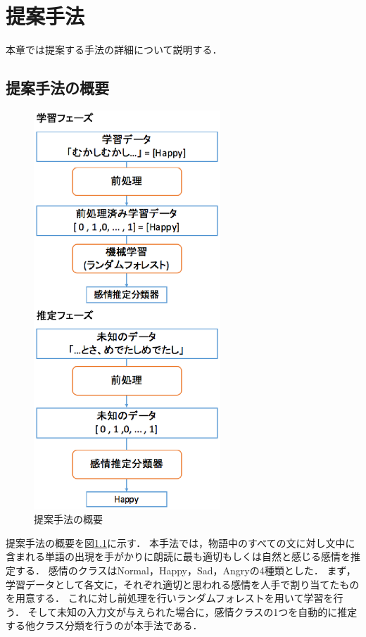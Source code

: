 \chapter{提案手法}

本章では提案する手法の詳細について説明する．

\section{提案手法の概要}
\begin{figure}[h]
  \begin{center}
    \includegraphics[clip,width=7.0cm]{fig/method-2.eps}
    \caption{提案手法の概要}
    \label{fig:method}
  \end{center}
\end{figure}

提案手法の概要を図\ref{fig:method}に示す．
本手法では，物語中のすべての文に対し文中に含まれる単語の出現を手がかりに朗読に最も適切もしくは自然と感じる感情を推定する．
感情のクラスはNormal，Happy，Sad，Angryの4種類とした．
まず，学習データとして各文に，それぞれ適切と思われる感情を人手で割り当てたものを用意する．
これに対し前処理を行いランダムフォレストを用いて学習を行う．
そして未知の入力文が与えられた場合に，感情クラスの1つを自動的に推定する他クラス分類を行うのが本手法である．

